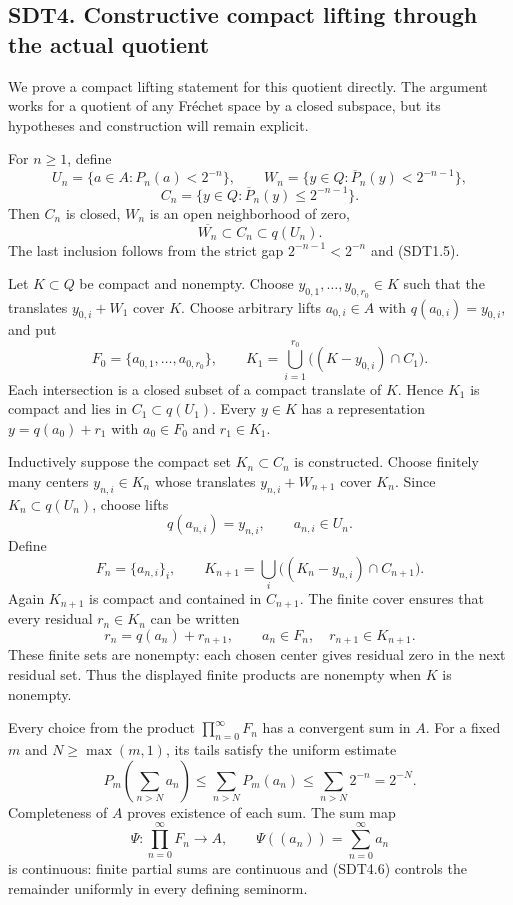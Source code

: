 \subsection{SDT4. Constructive compact lifting through the actual
quotient}\label{sdt4.-constructive-compact-lifting-through-the-actual-quotient}

We prove a compact lifting statement for this quotient directly. The
argument works for a quotient of any Fréchet space by a closed subspace,
but its hypotheses and construction will remain explicit.

For \(n\ge1\), define \[
U_n=\{a\in A:P_n(a)<2^{-n}\},\qquad
W_n=\{y\in Q:\overline P_n(y)<2^{-n-1}\},
\] \[
C_n=\{y\in Q:\overline P_n(y)\le2^{-n-1}\}.
\tag{SDT4.1}
\] Then \(C_n\) is closed, \(W_n\) is an open neighborhood of zero, \[
\overline{W_n}\subset C_n\subset q(U_n).
\tag{SDT4.2}
\] The last inclusion follows from the strict gap \(2^{-n-1}<2^{-n}\)
and (SDT1.5).

Let \(K\subset Q\) be compact and nonempty. Choose
\(y_{0,1},\ldots,y_{0,r_0}\in K\) such that the translates
\(y_{0,i}+W_1\) cover \(K\). Choose arbitrary lifts \(a_{0,i}\in A\)
with \(q(a_{0,i})=y_{0,i}\), and put \[
F_0=\{a_{0,1},\ldots,a_{0,r_0}\},\qquad
K_1=\bigcup_{i=1}^{r_0}\bigl((K-y_{0,i})\cap C_1\bigr).
\tag{SDT4.3}
\] Each intersection is a closed subset of a compact translate of \(K\).
Hence \(K_1\) is compact and lies in \(C_1\subset q(U_1)\). Every
\(y\in K\) has a representation \(y=q(a_0)+r_1\) with \(a_0\in F_0\) and
\(r_1\in K_1\).

Inductively suppose the compact set \(K_n\subset C_n\) is constructed.
Choose finitely many centers \(y_{n,i}\in K_n\) whose translates
\(y_{n,i}+W_{n+1}\) cover \(K_n\). Since \(K_n\subset q(U_n)\), choose
lifts \[
q(a_{n,i})=y_{n,i},\qquad a_{n,i}\in U_n.
\] Define \[
F_n=\{a_{n,i}\}_i,\qquad
K_{n+1}=\bigcup_i\bigl((K_n-y_{n,i})\cap C_{n+1}\bigr).
\tag{SDT4.4}
\] Again \(K_{n+1}\) is compact and contained in \(C_{n+1}\). The finite
cover ensures that every residual \(r_n\in K_n\) can be written \[
r_n=q(a_n)+r_{n+1},\qquad
a_n\in F_n,\quad r_{n+1}\in K_{n+1}.
\tag{SDT4.5}
\] These finite sets are nonempty: each chosen center gives residual
zero in the next residual set. Thus the displayed finite products are
nonempty when \(K\) is nonempty.

Every choice from the product \(\prod_{n=0}^\infty F_n\) has a
convergent sum in \(A\). For a fixed \(m\) and \(N\ge\max(m,1)\), its
tails satisfy the uniform estimate \[
P_m\left(\sum_{n>N}a_n\right)
\le\sum_{n>N}P_m(a_n)
\le\sum_{n>N}2^{-n}=2^{-N}.
\tag{SDT4.6}
\] Completeness of \(A\) proves existence of each sum. The sum map \[
\Psi:\prod_{n=0}^\infty F_n\longrightarrow A,\qquad
\Psi((a_n))=\sum_{n=0}^\infty a_n
\tag{SDT4.7}
\] is continuous: finite partial sums are continuous and (SDT4.6)
controls the remainder uniformly in every defining seminorm.

